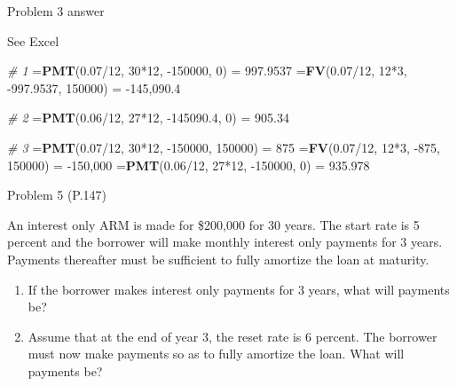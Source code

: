 \documentclass[ignorenonframetext,]{beamer}
\newenvironment{Shaded}{\begin{snugshade}}{\end{snugshade}}
\newcommand{\KeywordTok}[1]{\textcolor[rgb]{0.13,0.29,0.53}{\textbf{{#1}}}}
\newcommand{\DecValTok}[1]{\textcolor[rgb]{0.00,0.00,0.81}{{#1}}}
\newcommand{\FloatTok}[1]{\textcolor[rgb]{0.00,0.00,0.81}{{#1}}}
\newcommand{\StringTok}[1]{\textcolor[rgb]{0.31,0.60,0.02}{{#1}}}
\newcommand{\CommentTok}[1]{\textcolor[rgb]{0.56,0.35,0.01}{\textit{{#1}}}}
\newcommand{\NormalTok}[1]{{#1}}
\providecommand{\tightlist}{%
\setlength{\itemsep}{0pt}\setlength{\parskip}{0pt}}
\begin{document}
\begin{frame}[fragile]{Problem 3 answer}

\begin{Shaded}
\begin{Highlighting}[]
\NormalTok{See Excel}

\CommentTok{# 1}
\NormalTok{=}\KeywordTok{PMT}\NormalTok{(}\FloatTok{0.07}\NormalTok{/}\DecValTok{12}\NormalTok{, }\DecValTok{30}\NormalTok{*}\DecValTok{12}\NormalTok{, -}\DecValTok{150000}\NormalTok{, }\DecValTok{0}\NormalTok{) =}\StringTok{ }\FloatTok{997.9537}
\NormalTok{=}\KeywordTok{FV}\NormalTok{(}\FloatTok{0.07}\NormalTok{/}\DecValTok{12}\NormalTok{, }\DecValTok{12}\NormalTok{*}\DecValTok{3}\NormalTok{, -}\FloatTok{997.9537}\NormalTok{, }\DecValTok{150000}\NormalTok{) =}\StringTok{ }\NormalTok{-}\DecValTok{145}\NormalTok{,}\FloatTok{090.4}

\CommentTok{# 2}
\NormalTok{=}\KeywordTok{PMT}\NormalTok{(}\FloatTok{0.06}\NormalTok{/}\DecValTok{12}\NormalTok{, }\DecValTok{27}\NormalTok{*}\DecValTok{12}\NormalTok{, -}\FloatTok{145090.4}\NormalTok{, }\DecValTok{0}\NormalTok{) =}\StringTok{ }\FloatTok{905.34}

\CommentTok{# 3}
\NormalTok{=}\KeywordTok{PMT}\NormalTok{(}\FloatTok{0.07}\NormalTok{/}\DecValTok{12}\NormalTok{, }\DecValTok{30}\NormalTok{*}\DecValTok{12}\NormalTok{, -}\DecValTok{150000}\NormalTok{, }\DecValTok{150000}\NormalTok{) =}\StringTok{ }\DecValTok{875}
\NormalTok{=}\KeywordTok{FV}\NormalTok{(}\FloatTok{0.07}\NormalTok{/}\DecValTok{12}\NormalTok{, }\DecValTok{12}\NormalTok{*}\DecValTok{3}\NormalTok{, -}\DecValTok{875}\NormalTok{, }\DecValTok{150000}\NormalTok{) =}\StringTok{ }\NormalTok{-}\DecValTok{150}\NormalTok{,}\DecValTok{000}
\NormalTok{=}\KeywordTok{PMT}\NormalTok{(}\FloatTok{0.06}\NormalTok{/}\DecValTok{12}\NormalTok{, }\DecValTok{27}\NormalTok{*}\DecValTok{12}\NormalTok{, -}\DecValTok{150000}\NormalTok{, }\DecValTok{0}\NormalTok{) =}\StringTok{ }\FloatTok{935.978}
\end{Highlighting}
\end{Shaded}

\normalsize

\end{frame}

\begin{frame}{Problem 5 (P.147)}

\small

An interest only ARM is made for \$200,000 for 30 years. The start rate
is 5 percent and the borrower will make monthly interest only payments
for 3 years. Payments thereafter must be sufficient to fully amortize
the loan at maturity.

\begin{enumerate}
\def\labelenumi{\alph{enumi}.}
\tightlist
\item
  If the borrower makes interest only payments for 3 years, what will
  payments be?
\item
  Assume that at the end of year 3, the reset rate is 6 percent. The
  borrower must now make payments so as to fully amortize the loan. What
  will payments be?
\end{enumerate}

\end{frame}
\end{document}
